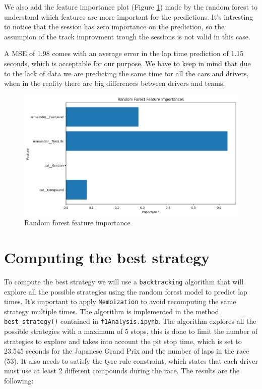 \documentclass[12pt,a4paper]{article}
\begin{document}
We also add the feature importance plot (Figure \ref{fig:feature_importance}) made by the random forest to understand which features are more important for the predictions. It's intresting to notice that the session has zero importance on the prediction, so the assumpion of the track improvment trough the sessions is not valid in this case.

A MSE of 1.98 comes with an average error in the lap time prediction of 1.15 seconds, which is acceptable for our purpose. We have to keep in mind that due to the lack of data we are predicting the same time for all the cars and drivers, when in the reality there are big differences between drivers and teams.
\begin{figure}
    \centering
    \includegraphics[width=1\textwidth]{featureimp.png}
    \caption{Random forest feature importance}
    \label{fig:feature_importance}
\end{figure}

\section{Computing the best strategy}
To compute the best strategy we will use a \texttt{backtracking} algorithm that will explore all the possible strategies using the random forest model to predict lap times. It's important to apply \texttt{Memoization} to avoid recomputing the same strategy multiple times. The algorithm is implemented in the method \verb|best_strategy()| contained in \texttt{f1Analysis.ipynb}.
The algorithm explores all the possible strategies with a maximum of 5 stops, this is done to limit the number of strategies to explore and takes into account the pit stop time, which is set to 23.545 seconds for the Japanese Grand Prix and the number of laps in the race (53). It also needs to satisfy the tyre rule constraint, which states that each driver must use at least 2 different compounds during the race. The results are the following:
\end{document}
